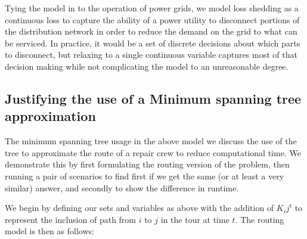 \documentclass{article}
\begin{document}
	Tying the model in to the operation of power grids, we model loss shedding as a continuous loss to capture the ability of a power utility to disconnect portions of the distribution network in order to reduce the demand on the grid to what can be serviced. In practice, it would be a set of discrete decisions about which parts to disconnect, but relaxing to a single continuous variable captures most of that decision making while not complicating the model to an unreasonable degree.
	
	\subsection{Justifying the use of a Minimum spanning tree approximation}
	The minimum spanning tree usage in the above model we discuss the use of the tree to approximate the route of a repair crew to reduce computational time. We demonstrate this by first formulating the routing version of the problem, then running a pair of scenarios to find first if we get the same (or at least a very similar) answer, and secondly to show the difference in runtime.
	
	We begin by defining our sets and variables as above with the addition of $K_ij^t$ to represent the inclusion of path from $i$ to $j$ in the tour at time $t$. The routing model is then as follows:
	
\end{document}
